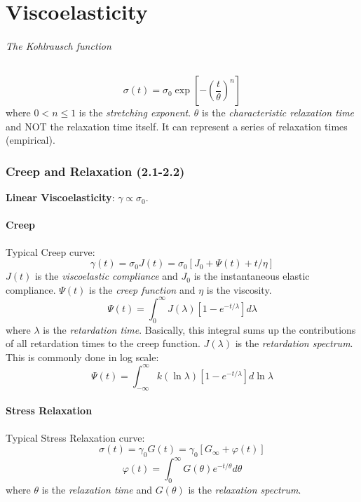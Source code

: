 \part{Viscoelasticity}
\paragraph{The Kohlrausch function}
\begin{equation}
	\sigma(t) = \sigma_0\exp\left[-\left(\frac{t}{\theta}\right)^n\right]
\end{equation}
where $0 < n \leq 1$ is the \emph{stretching exponent}. $\theta$ is the \emph{characteristic relaxation time} and NOT the relaxation time itself.
It can represent a series of relaxation times (empirical).


\section{Creep and Relaxation (2.1-2.2)}
\textbf{Linear Viscoelasticity}: $\gamma \propto \sigma_0$.

\subsection{Creep}
Typical Creep curve:
\begin{equation}
	\gamma(t) = \sigma_0  J(t)
	= \sigma_0 \left[J_0 + \Psi(t)+ t / \eta \right]
\end{equation}
$J(t)$ is the \emph{viscoelastic compliance} and $J_0$ is the instantaneous elastic compliance.
$\Psi(t)$ is the \emph{creep function} and $\eta$ is the viscosity.
\begin{equation}
	\Psi(t) = \int_0^\infty J(\lambda) \left[1 - e^{-t/\lambda}\right] d\lambda
\end{equation}
where $\lambda$ is the \emph{retardation time}. Basically, this integral sums up the contributions of all retardation times to the creep function.
$J(\lambda)$ is the \emph{retardation spectrum}.
This is commonly done in log scale:
\begin{equation}
	\Psi(t) = \int_{-\infty}^\infty  k(\ln \lambda) \left[1 - e^{-t/\lambda}\right] d\ln \lambda
\end{equation}

\subsection{Stress Relaxation}
Typical Stress Relaxation curve:
\begin{equation}
	\sigma(t) = \gamma_0 G(t)
	= \gamma_0 \left[G_\infty + \varphi(t)\right]
\end{equation}
\begin{equation}
	\varphi(t) = \int_0^\infty G(\theta) e^{-t/\theta} d\theta
\end{equation}
where $\theta$ is the \emph{relaxation time} and $G(\theta)$ is the \emph{relaxation spectrum}.



